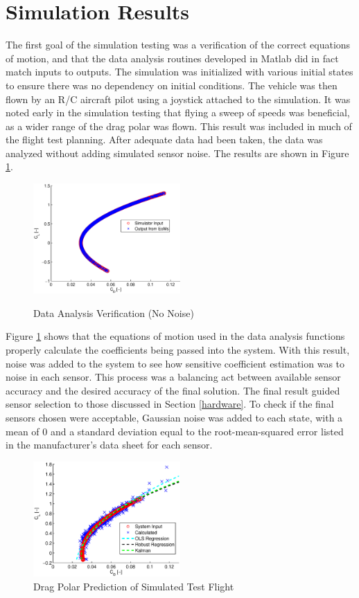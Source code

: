 \section{Simulation Results}
The first goal of the simulation testing was a verification of the correct equations of motion, and that the data analysis routines developed in Matlab did in fact match inputs to outputs. The simulation was initialized with various initial states to ensure there was no dependency on initial conditions. The vehicle was then flown by an R/C aircraft pilot using a joystick attached to the simulation. It was noted early in the simulation testing that flying a sweep of speeds was beneficial, as a wider range of the drag polar was flown. This result was included in much of the flight test planning. After adequate data had been taken, the data was analyzed without adding simulated sensor noise. The results are shown in Figure \ref{dragPolarNoNoise}.

\begin{figure}[h!]
  \centering
  \caption{Data Analysis Verification (No Noise)} 
    \includegraphics[width=0.5\textwidth]{figures/dragPolarNoNoise.eps}
    \label{dragPolarNoNoise}
\end{figure}

Figure \ref{dragPolarNoNoise} shows that the equations of motion used in the data analysis functions properly calculate the coefficients being passed into the system. With this result, noise was added to the system to see how sensitive coefficient estimation was to noise in each sensor. This process was a balancing act between available sensor accuracy and the desired accuracy of the final solution. The final result guided sensor selection to those discussed in Section \ref{hardware}. To check if the final sensors chosen were acceptable, Gaussian noise was added to each state, with a mean of $0$ and a standard deviation equal to the root-mean-squared error listed in the manufacturer's data sheet for each sensor.
\begin{figure}[H]
  \caption{Drag Polar Prediction of Simulated Test Flight} \label{dragPolarNoise}
  \centering
    \includegraphics[width=0.5\textwidth]{figures/simDragPolarNoise.eps}
\end{figure}

